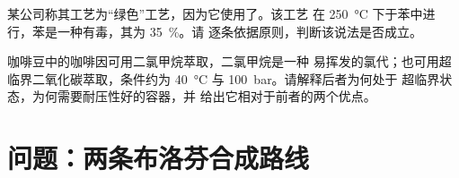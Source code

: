 \begin{exercise}[$\star\star\star$]\label{exo:g12:synthesis-strategy:14}
某公司称其工艺为“绿色”工艺，因为它使用了。该工艺
在 \qty{250}{\celsius} 下于苯中进行，苯是一种有毒，其为
\qty{35}{\percent}。请
逐条依据原则，判断该说法是否成立。
\end{exercise}

\begin{exercise}[$\star\star\star$]\label{exo:g12:synthesis-strategy:15}
咖啡豆中的咖啡因可用二氯甲烷萃取，二氯甲烷是一种
易挥发的氯代；也可用超临界二氧化碳萃取，条件约为
\qty{40}{\celsius} 与 \qty{100}{bar}。请解释后者为何处于
超临界状态，为何需要耐压性好的容器，并
给出它相对于前者的两个优点。
\end{exercise}

\section{问题：两条布洛芬合成路线}

